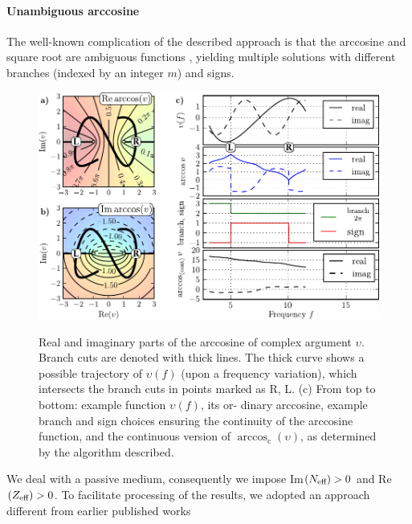 \paragraph{Unambiguous arccosine} %
The well-known complication of the described approach is that the arccosine and square root are ambiguous functions \cite{simovski09}, yielding multiple solutions with different branches (indexed by an integer $m$) and signs. 

\begin{figure} \centering \caption{ Real and imaginary parts of the arccosine of complex argument $\upsilon$. Branch cuts are denoted with thick lines. The thick curve shows a possible trajectory of  $\upsilon(f)$ (upon a frequency variation), which intersects the branch cuts in points marked as R, L. (c) From top to bottom: example function  $\upsilon(f)$, its or- dinary arccosine, example branch and sign choices ensuring the continuity of the arccosine function, and the continuous version of $\arccos_{\mathrm{c}}(\upsilon)$, as determined by the algorithm described.} \includegraphics[width=\textwidth]{img/continuous_arccos/continuous_arccos_new.pdf} \label{fg_arccos}
\end{figure}
We deal with a passive medium, consequently we impose Im$(N_{\text{eff} })>0$ and Re$(Z_{\text{eff} })>0$. %
To facilitate processing of the results, we adopted an approach different from earlier published works \cite{smith2002determination,chen2004robust}
